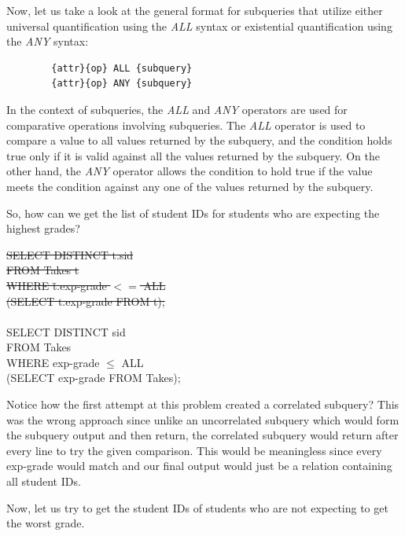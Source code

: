 \documentclass{article}
\begin{document}
Now, let us take a look at the general format for subqueries that utilize either universal quantification using the \textit{ALL} syntax or existential quantification using the \textit{ANY} syntax:

\begin{tcolorbox}
    \begin{verbatim}
        {attr}{op} ALL {subquery}
        {attr}{op} ANY {subquery}
    \end{verbatim}
\end{tcolorbox}

In the context of subqueries, the \textit{ALL} and \textit{ANY} operators are used for comparative operations involving subqueries. The \textit{ALL} operator is used to compare a value to all values returned by the subquery, and the condition holds true only if it is valid against all the values returned by the subquery. On the other hand, the \textit{ANY} operator allows the condition to hold true if the value meets the condition against any one of the values returned by the subquery.

So, how can we get the list of student IDs for students who are expecting the highest grades?

\begin{tcolorbox}
    \sout{SELECT DISTINCT t.sid\\
    FROM Takes t\\
    WHERE \= t.exp-grade $<=$ ALL\\
    \>(SELECT t.exp-grade FROM t);}\\
    \\
    SELECT DISTINCT sid\\
    FROM Takes\\
    WHERE exp-grade $\leq$ ALL \\
    \hspace{1cm}(SELECT exp-grade FROM Takes);\\
\end{tcolorbox}
Notice how the first attempt at this problem created a correlated subquery? This was the wrong approach since unlike an uncorrelated subquery which would form the subquery output and then return, the correlated subquery would return after every line to try the given comparison. This would be meaningless since every exp-grade would match and our final output would just be a relation containing all student IDs.

Now, let us try to get the student IDs of students who are not expecting to get the worst grade.
\end{document}
